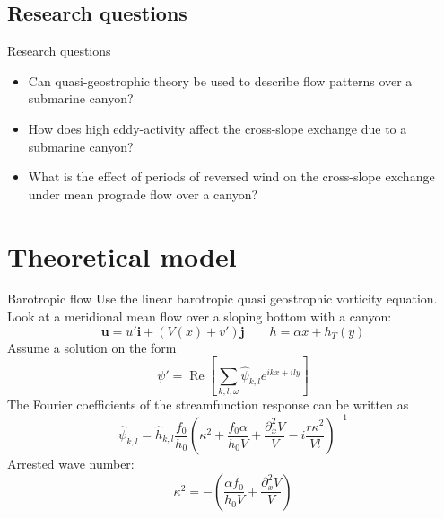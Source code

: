 \documentclass{beamer}
\newcommand{\pdd}[1]{\partial_{#1}^2}
\begin{document}
\subsection{Research questions}

\begin{frame}{Research questions}
    \begin{itemize}
    \item Can quasi-geostrophic theory be used to describe flow patterns over a submarine canyon?
    \item How does high eddy-activity affect the cross-slope exchange due to a submarine canyon?
    \item What is the effect of periods of reversed wind on the cross-slope exchange under mean prograde flow over a canyon? 
\end{itemize}
\end{frame}

\section{Theoretical model}

\begin{frame}{Barotropic flow}
Use the linear barotropic quasi geostrophic vorticity equation. 
Look at a meridional mean flow over a sloping bottom with a canyon: 
\begin{equation*}
    \mathbf{u} = u'\mathbf{i} + \left(V(x)+v'\right)\mathbf{j} \qquad h = \alpha x + h_T(y)
\end{equation*}
Assume a solution on the form
\begin{equation*}
    \psi' = \operatorname{Re}\left[\sum_{k,l,\omega} \hat{\psi}_{k,l}e^{ikx+ily}\right]
\end{equation*}
The Fourier coefficients of the streamfunction response can be written as
\begin{equation*}
    \hat{\psi}_{k,l} = \hat{h}_{k,l}\frac{f_0}{h_0}\left( \kappa^2 + \frac{f_0\alpha}{h_0V} + \frac{\pdd{x}V}{V} - i \frac{r\kappa^2}{Vl}\right)^{-1}
\end{equation*}
Arrested wave number:
\begin{equation*}
    \kappa^2 = -\left(\frac{\alpha f_0}{h_0V} + \frac{\pdd{x}V}{V}\right)
\end{equation*}
\end{frame}
\end{document}
